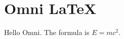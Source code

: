 \documentclass{article}
\begin{document}
\section{Omni LaTeX}
Hello Omni. The formula is $E=mc^2$.
\end{document}

